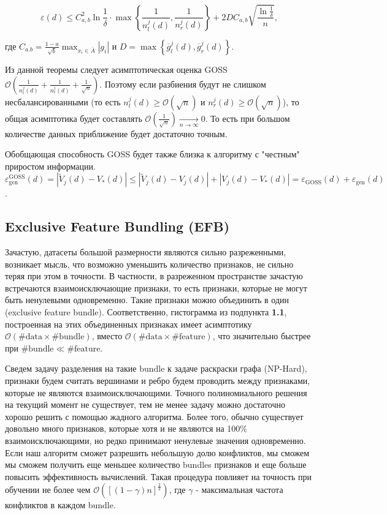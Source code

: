\begin{equation*}
    \varepsilon(d) \leqslant C_{a, b}^2 \ln \frac{1}{\delta} \cdot \max \left\{\frac{1}{n^j_l(d)}, \frac{1}{n^j_r(d)}\right\} + 2DC_{a, b}\sqrt{\frac{\ln \frac{1}{\delta}}{n}},
\end{equation*}

где $C_{a. b} = \frac{1 - a}{\sqrt{b}}\max_{x_i \in \overline{A}}|g_i|$ и $D = \max\left\{\overline{g}_l^j(d), \overline{g}_r^j(d)\right\}$.

Из данной теоремы следует асимптотическая оценка GOSS $\mathcal{O}\left(\frac{1}{n^j_l(d)} + \frac{1}{n^j_r(d)} + \frac{1}{\sqrt{n}}\right)$. Поэтому если разбиения будут не слишком несбалансированными (то есть $n^j_l(d) \geqslant \mathcal{O}(\sqrt{n})$ и $n^j_r(d) \geqslant \mathcal{O}(\sqrt{n})$), то общая асимптотика будет составлять $\mathcal{O}\left(\frac{1}{\sqrt{n}}\right) \underset{n\rightarrow \infty}{\rightarrow} 0$. То есть при большом количестве данных приближение будет достаточно точным.

Обобщающая способность GOSS будет также близка к алгоритму с "честным" приростом информации. $\varepsilon_{\text{gen}}^{\text{GOSS}}(d) = |\widetilde{V}_j(d) - V_*(d)| \leqslant |\widetilde{V}_j(d) - V_j(d)| + |V_j(d) - V_*(d)| = \varepsilon_{\text{GOSS}}(d) + \varepsilon_{\text{gen}}(d)$.


\subsection{Exclusive Feature Bundling (EFB)}

Зачастую, датасеты большой размерности являются сильно разреженными, возникает мысль, что возможно уменьшить количество признаков, не сильно теряя при этом в точности. В частности, в разреженном пространстве зачастую встречаются взаимоисключающие признаки, то есть признаки, которые не могут быть ненулевыми одновременно. Такие признаки можно объединить в один (exclusive feature bundle). Соответственно, гистограмма из подпункта \textbf{1.1}, построенная на этих объединенных признаках имеет асимптотику $\mathcal{O}(\#\text{data}\times\#\text{bundle})$, вместо $\mathcal{O}(\#\text{data}\times\#\text{feature})$, что значительно быстрее при $\text{\#bundle} \ll \#\text{feature}$.

Сведем задачу разделения на такие $\text{bundle}$ к задаче раскраски графа (NP-Hard), признаки будем считать вершинами и ребро будем проводить между признаками, которые не являются взаимоисключающими. Точного полиномиального решения на текущий момент не существует, тем не менее задачу можно достаточно хорошо решить с помощью жадного алгоритма. Более того, обычно существует довольно много признаков, которые хотя и не являются на 100\% взаимоисключающими, но редко принимают ненулевые значения одновременно. Если наш алгоритм сможет разрешить небольшую долю конфликтов, мы сможем мы сможем получить еще меньшее количество bundles признаков и еще больше повысить эффективность вычислений. Такая процедура повлияет на точность при обучении не более чем $\mathcal{O}\left([(1-\gamma)n]^{\frac{2}{3}}\right)$, где $\gamma$ - максимальная частота конфликтов в каждом bundle.

